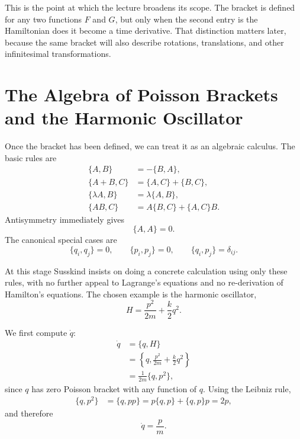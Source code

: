 This is the point at which the lecture broadens its scope. The bracket is defined for any two functions \(F\) and \(G\), but only when the second entry is the Hamiltonian does it become a time derivative. That distinction matters later, because the same bracket will also describe rotations, translations, and other infinitesimal transformations.

\section{The Algebra of Poisson Brackets and the Harmonic Oscillator}

Once the bracket has been defined, we can treat it as an algebraic calculus. The basic rules are
\begin{align}
\{A,B\}&=-\{B,A\},\\
\{A+B,C\}&=\{A,C\}+\{B,C\},\\
\{\lambda A,B\}&=\lambda\{A,B\},\\
\{AB,C\}&=A\{B,C\}+\{A,C\}B.
\end{align}
Antisymmetry immediately gives
\begin{equation}
\{A,A\}=0.
\end{equation}
The canonical special cases are
\begin{equation}
\{q_i,q_j\}=0,\qquad \{p_i,p_j\}=0,\qquad \{q_i,p_j\}=\delta_{ij}.
\end{equation}

At this stage Susskind insists on doing a concrete calculation using only these rules, with no further appeal to Lagrange's equations and no re-derivation of Hamilton's equations. The chosen example is the harmonic oscillator,
\begin{equation}
H=\frac{p^2}{2m}+\frac{k}{2}q^2.
\end{equation}

We first compute \(\dot q\):
\begin{align}
\dot q
&=\{q,H\}\\
&=\left\{q,\frac{p^2}{2m}+\frac{k}{2}q^2\right\}\\
&=\frac{1}{2m}\{q,p^2\},
\end{align}
since \(q\) has zero Poisson bracket with any function of \(q\). Using the Leibniz rule,
\begin{align}
\{q,p^2\}&=\{q,pp\}=p\{q,p\}+\{q,p\}p=2p,
\end{align}
and therefore
\begin{equation}
\dot q=\frac{p}{m}.
\end{equation}

